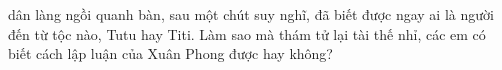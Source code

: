 dân làng ngồi quanh bàn, sau một chút suy nghĩ, đã biết được ngay ai là người đến từ tộc nào, Tutu hay Titi. Làm sao mà thám tử lại tài thế nhỉ, các em có biết cách lập luận của Xuân Phong được hay không?
%	
%

